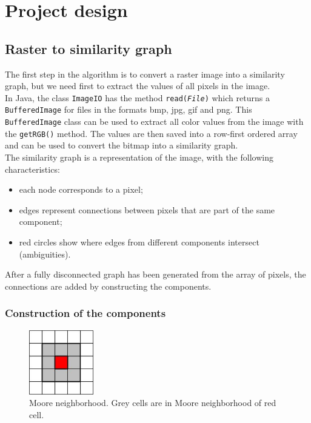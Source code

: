 \documentclass[]{usiinfbachelorproject}
\begin{document}
\section{Project design} \label{sec:design}

\subsection{Raster to similarity graph} \label{sec:similarity}

The first step in the algorithm is to convert a raster image into a similarity graph, but we need first to extract the values of all pixels in the image. \\
In Java, the class {\tt ImageIO} has the method {\tt read(\emph{File})} which returns a {\tt BufferedImage} for files in the formats bmp, jpg, gif and png. This {\tt BufferedImage} class can be used to extract all color values from the image with the {\tt getRGB()} method. The values are then saved into a row-first ordered array and can be used to convert the bitmap into a similarity graph. \\
The similarity graph is a representation of the image, with the following characteristics:
\begin{itemize}
	\item each node corresponds to a pixel;
	\item edges represent connections between pixels that are part of the same component;
	\item red circles show where edges from different components intersect (ambiguities).
\end{itemize}
After a fully disconnected graph has been generated from the array of pixels, the connections are added by constructing the components.

\subsubsection{Construction of the components} \label{sec:constructcomp}

\begin{figure}
 	\centering
	\vspace{-1.cm}
	\includegraphics[width=0.25\textwidth]{img/moore.jpeg}
  	\caption{Moore neighborhood. Grey cells are in Moore neighborhood of red cell.}
	\label{fig:moore}
\end{figure}
\end{document}
